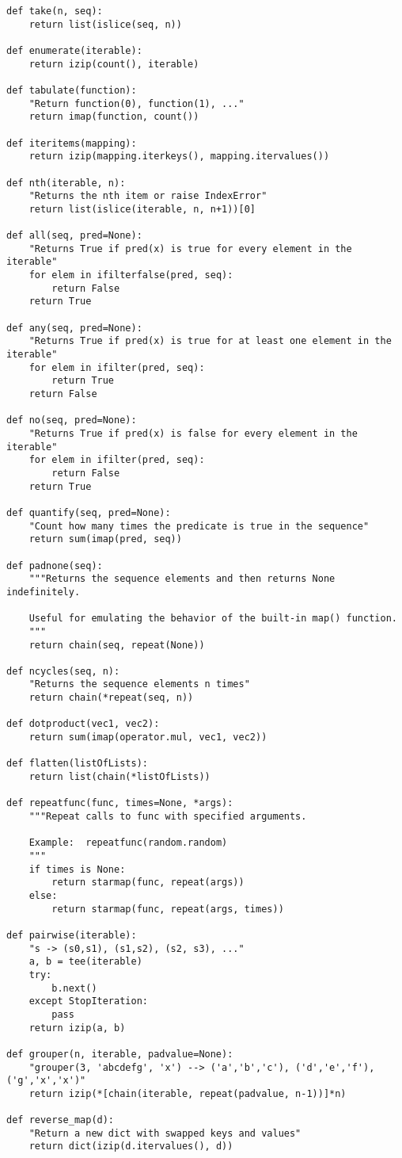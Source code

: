 \begin{verbatim}
def take(n, seq):
    return list(islice(seq, n))

def enumerate(iterable):
    return izip(count(), iterable)

def tabulate(function):
    "Return function(0), function(1), ..."
    return imap(function, count())

def iteritems(mapping):
    return izip(mapping.iterkeys(), mapping.itervalues())

def nth(iterable, n):
    "Returns the nth item or raise IndexError"
    return list(islice(iterable, n, n+1))[0]

def all(seq, pred=None):
    "Returns True if pred(x) is true for every element in the iterable"
    for elem in ifilterfalse(pred, seq):
        return False
    return True

def any(seq, pred=None):
    "Returns True if pred(x) is true for at least one element in the iterable"
    for elem in ifilter(pred, seq):
        return True
    return False

def no(seq, pred=None):
    "Returns True if pred(x) is false for every element in the iterable"
    for elem in ifilter(pred, seq):
        return False
    return True

def quantify(seq, pred=None):
    "Count how many times the predicate is true in the sequence"
    return sum(imap(pred, seq))

def padnone(seq):
    """Returns the sequence elements and then returns None indefinitely.

    Useful for emulating the behavior of the built-in map() function.
    """
    return chain(seq, repeat(None))

def ncycles(seq, n):
    "Returns the sequence elements n times"
    return chain(*repeat(seq, n))

def dotproduct(vec1, vec2):
    return sum(imap(operator.mul, vec1, vec2))

def flatten(listOfLists):
    return list(chain(*listOfLists))

def repeatfunc(func, times=None, *args):
    """Repeat calls to func with specified arguments.
    
    Example:  repeatfunc(random.random)
    """
    if times is None:
        return starmap(func, repeat(args))
    else:
        return starmap(func, repeat(args, times))

def pairwise(iterable):
    "s -> (s0,s1), (s1,s2), (s2, s3), ..."
    a, b = tee(iterable)
    try:
        b.next()
    except StopIteration:
        pass
    return izip(a, b)

def grouper(n, iterable, padvalue=None):
    "grouper(3, 'abcdefg', 'x') --> ('a','b','c'), ('d','e','f'), ('g','x','x')"
    return izip(*[chain(iterable, repeat(padvalue, n-1))]*n)

def reverse_map(d):
    "Return a new dict with swapped keys and values"
    return dict(izip(d.itervalues(), d))

\end{verbatim}
